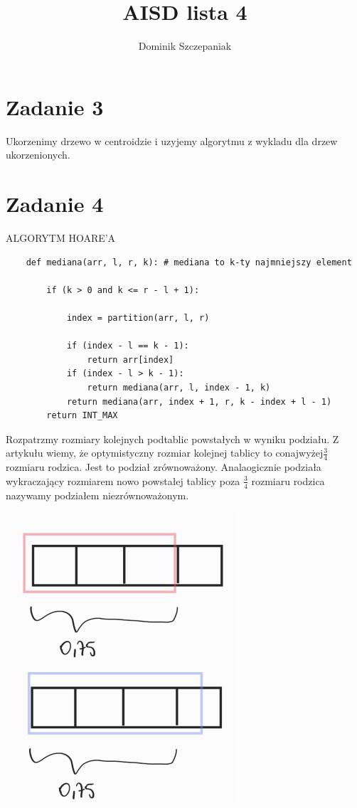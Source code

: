 \documentclass[12pt]{article}
\title{AISD lista 4}
\author{Dominik Szczepaniak}
\begin{document}
\maketitle

\bgroup\obeylines

\section{Zadanie 3}
Ukorzenimy drzewo w centroidzie i uzyjemy algorytmu z wykladu dla drzew ukorzenionych.

\section{Zadanie 4}


ALGORYTM HOARE'A
\begin{lstlisting}
    def mediana(arr, l, r, k): # mediana to k-ty najmniejszy element

        if (k > 0 and k <= r - l + 1):

            index = partition(arr, l, r)
            
            if (index - l == k - 1):
                return arr[index]
            if (index - l > k - 1):
                return mediana(arr, l, index - 1, k)
            return mediana(arr, index + 1, r, k - index + l - 1)
        return INT_MAX
\end{lstlisting}

Rozpatrzmy rozmiary kolejnych podtablic powstałych w wyniku podziału.
Z artykułu wiemy, że optymistyczny rozmiar kolejnej tablicy to conajwyżej$\frac{3}{4}$ rozmiaru rodzica. Jest to podział zrównoważony.
Analaogicznie podziała wykraczający rozmiarem nowo powstałej tablicy poza $\frac{3}{4}$ rozmiaru rodzica nazywamy podziałem niezrównoważonym. 

\includegraphics[scale=0.5]{zad4_1.png}
\end{document}
